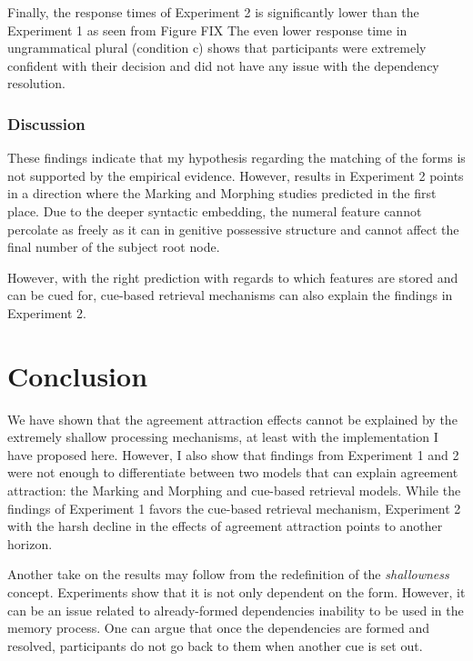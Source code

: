 \documentclass[english,doc]{apa6}
\begin{document}
Finally, the response times of Experiment 2 is significantly lower than the Experiment 1 as seen from Figure FIX The even lower response time in ungrammatical plural (condition c) shows that participants were extremely confident with their decision and did not have any issue with the dependency resolution.

\hypertarget{discussion-1}{%
\subsubsection{Discussion}\label{discussion-1}}

These findings indicate that my hypothesis regarding the matching of the forms is not supported by the empirical evidence. However, results in Experiment 2 points in a direction where the Marking and Morphing studies predicted in the first place. Due to the deeper syntactic embedding, the numeral feature cannot percolate as freely as it can in genitive possessive structure and cannot affect the final number of the subject root node.

However, with the right prediction with regards to which features are stored and can be cued for, cue-based retrieval mechanisms can also explain the findings in Experiment 2.

\hypertarget{conclusion}{%
\section{Conclusion}\label{conclusion}}

We have shown that the agreement attraction effects cannot be explained by the extremely shallow processing mechanisms, at least with the implementation I have proposed here. However, I also show that findings from Experiment 1 and 2 were not enough to differentiate between two models that can explain agreement attraction: the Marking and Morphing and cue-based retrieval models. While the findings of Experiment 1 favors the cue-based retrieval mechanism, Experiment 2 with the harsh decline in the effects of agreement attraction points to another horizon.

Another take on the results may follow from the redefinition of the \emph{shallowness} concept. Experiments show that it is not only dependent on the form. However, it can be an issue related to already-formed dependencies inability to be used in the memory process. One can argue that once the dependencies are formed and resolved, participants do not go back to them when another cue is set out.
\end{document}
